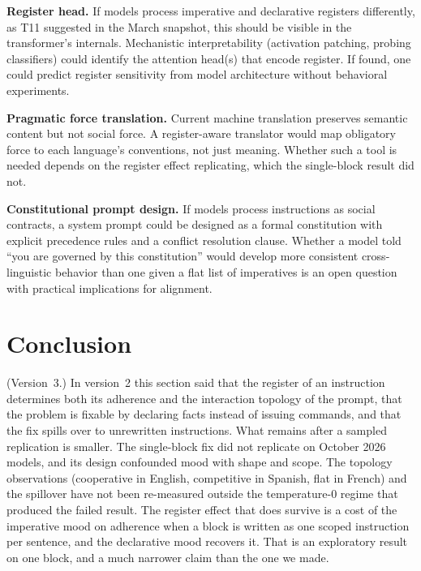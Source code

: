 \documentclass[11pt,a4paper]{article}
\begin{document}
\textbf{Register head.} If models process imperative and declarative
registers differently, as T11 suggested in the March snapshot, this should
be visible in the transformer's internals. Mechanistic
interpretability (activation patching, probing classifiers) could
identify the attention head(s) that encode register. If found, one
could predict register sensitivity from model architecture without
behavioral experiments.

\textbf{Pragmatic force translation.} Current machine translation
preserves semantic content but not social force. A register-aware
translator would map obligatory force to each language's conventions,
not just meaning. Whether such a tool is needed depends on the
register effect replicating, which the single-block result did not.

\textbf{Constitutional prompt design.} If models process instructions
as social contracts, a system prompt could be designed as a formal
constitution with explicit precedence rules and a conflict resolution
clause. Whether a model told ``you are governed by this constitution''
would develop more consistent cross-linguistic behavior than one given
a flat list of imperatives is an open question with practical
implications for alignment.

\section{Conclusion}
\label{sec:conclusion}

(Version~3.) In version~2 this section said that the register of an
instruction determines both its adherence and the interaction topology
of the prompt, that the problem is fixable by declaring facts instead
of issuing commands, and that the fix spills over to unrewritten
instructions. What remains after a sampled replication is smaller. The
single-block fix did not replicate on October 2026 models, and its
design confounded mood with shape and scope. The topology
observations (cooperative in English, competitive in Spanish, flat in
French) and the spillover have not been re-measured outside the
temperature-0 regime that produced the failed result. The register
effect that does survive is a cost of the imperative mood on
adherence when a block is written as one scoped instruction per
sentence, and the declarative mood recovers it. That is an
exploratory result on one block, and a much narrower claim than the
one we made.
\end{document}
